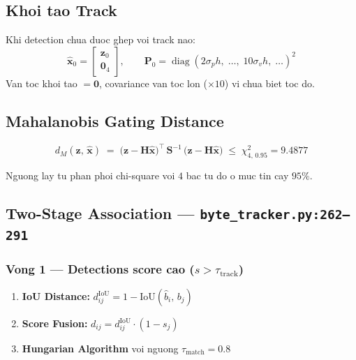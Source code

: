 \documentclass[12pt, a4paper]{article}
\newcommand{\mat}[1]{\mathbf{#1}}
\newcommand{\vect}[1]{\bm{#1}}
\newcommand{\T}{^{\top}}
\newcommand{\diag}{\operatorname{diag}}
\begin{document}
\subsection{Khoi tao Track}

Khi detection chua duoc ghep voi track nao:
\[
  \hat{\vect{x}}_0 = \begin{bmatrix} \vect{z}_0 \\ \vect{0}_4 \end{bmatrix},
  \qquad
  \mat{P}_0 = \diag(2\sigma_p h,\;\ldots,\;10\sigma_v h,\;\ldots)^2
\]
Van toc khoi tao $= \vect{0}$, covariance van toc lon ($\times 10$) vi chua biet toc do.

\subsection{Mahalanobis Gating Distance}

\begin{formulabox}
\[
  d_M(\vect{z},\, \hat{\vect{x}}) \;=\;
  \bigl(\vect{z} - \mat{H}\hat{\vect{x}}\bigr)\T
  \,\mat{S}^{-1}\,
  \bigl(\vect{z} - \mat{H}\hat{\vect{x}}\bigr)
  \;\leq\; \chi^2_{4,\,0.95} = 9.4877
\]
\end{formulabox}

Nguong lay tu phan phoi chi-square voi $4$ bac tu do o muc tin cay $95\%$.

\subsection{Two-Stage Association --- \texttt{byte\_tracker.py:262--291}}

\subsubsection{Vong 1 --- Detections score cao ($s > \tau_{\text{track}}$)}
\begin{enumerate}[label=\textbf{\arabic*.}]
  \item \textbf{IoU Distance:}
    $\displaystyle d_{ij}^{\text{IoU}} = 1 - \text{IoU}(\hat{b}_i,\, b_j)$
  \item \textbf{Score Fusion:}
    $\displaystyle d_{ij} = d_{ij}^{\text{IoU}} \cdot (1 - s_j)$
  \item \textbf{Hungarian Algorithm} voi nguong $\tau_{\text{match}} = 0.8$
\end{enumerate}
\end{document}

